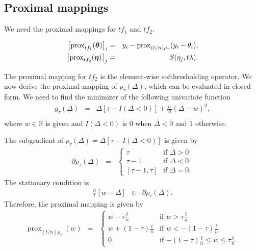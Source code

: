 \documentclass{article}
\newcommand{\Real}{\mathbb{R}}
\newcommand{\V}[1]{{\bm{\mathbf{\MakeLowercase{#1}}}}} %
\newcommand{\VE}[2]{\MakeLowercase{#1}_{#2}} %
\newcommand{\prox}[2]{\operatorname{prox}_{#1}({#2})}
\begin{document}
\subsection*{Proximal mappings}

We need the proximal mappings for $tf_1$ and $tf_2$.

\begin{eqnarray*}
\left [\prox{tf_1}{\V{\theta}} \right ]_i & = & \VE{y}{i} - \prox{(t/n)\rho_\tau}{\VE{y}{i} - \VE{\theta}{i}}, \\
\left [\prox{tf_2}{\V{\eta}} \right ]_j & = & S(\VE{\eta}{j}, t\lambda).
\end{eqnarray*}

The proximal mapping for $tf_2$ is the element-wise softhresholding operator. We now derive the  proximal mapping of $\rho_\tau(\Delta)$, which can be evaluated in closed form. We need to find the minimizer of the following univariate function
\begin{eqnarray*}
g_\tau(\Delta) & = & \Delta[\tau - I(\Delta < 0)] +  \frac{n}{2t} (\Delta - w)^2, \\
\end{eqnarray*}
where $w \in \Real$ is given and $I(\Delta < 0)$ is 0 when $\Delta < 0$ and 1 otherwise.

The subgradient of $\rho_\tau(\Delta) = \Delta[\tau - I(\Delta < 0)]$ is given by
\begin{eqnarray*}
\partial \rho_\tau(\Delta) & = & \begin{cases}
\tau & \text{if $\Delta > 0$} \\
\tau - 1 & \text{if $\Delta < 0$} \\
[\tau - 1, \tau] & \text{if $\Delta = 0$}.
\end{cases}
\end{eqnarray*}
The stationary condition is
\begin{eqnarray*}
\frac{n}{t}[w - \Delta] & \in & \partial \rho_\tau(\Delta).
\end{eqnarray*}
Therefore, the proximal mapping is given by 
\begin{eqnarray*}
\prox{(t/n) \rho_\tau}{w} & = & \begin{cases}
w - \tau \frac{t}{n}& \text{if $w > \tau \frac{t}{n}$} \\
w + (1-\tau)\frac{t}{n} & \text{if $w < - (1-\tau)\frac{t}{n}$} \\
0 & \text{if $-(1- \tau)\frac{t}{n} \leq w \leq \tau \frac{t}{n}$.}
\end{cases}
\end{eqnarray*}
\end{document}
